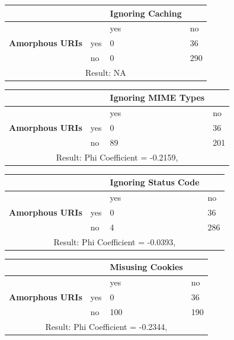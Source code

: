 \documentclass[a4paper,12pt]{article}
\begin{document}
\begin{center}
  \begin{tabular}{| p{60mm} | p{10mm} | p{35mm} | p{35mm} |}
  \hline
   & & \textbf{Ignoring Caching} &
  \\
  \hline
  & & yes & no
  \\
  \hline
  \textbf{Amorphous URIs} & yes & 0 & 36
  \\
  \hline
   & no & 0 & 290
  \\
  \hline
  \multicolumn{4}{|c|}{Result: NA}
  \\ \hline
  \end{tabular}
  \end{center}

\begin{center}
  \begin{tabular}{| p{60mm} | p{10mm} | p{35mm} | p{35mm} |}
  \hline
   & & \textbf{Ignoring MIME Types} &
  \\
  \hline
  & & yes & no
  \\
  \hline
  \textbf{Amorphous URIs} & yes & 0 & 36
  \\
  \hline
   & no & 89 & 201
  \\
  \hline
  \multicolumn{4}{|c|}{Result: Phi Coefficient = -0.2159, }
  \\ \hline
  \end{tabular}
  \end{center}

\begin{center}
  \begin{tabular}{| p{60mm} | p{10mm} | p{35mm} | p{35mm} |}
  \hline
   & & \textbf{Ignoring Status Code} &
  \\
  \hline
  & & yes & no
  \\
  \hline
  \textbf{Amorphous URIs} & yes & 0 & 36
  \\
  \hline
   & no & 4 & 286
  \\
  \hline
  \multicolumn{4}{|c|}{Result: Phi Coefficient = -0.0393, }
  \\ \hline
  \end{tabular}
  \end{center}

\begin{center}
  \begin{tabular}{| p{60mm} | p{10mm} | p{35mm} | p{35mm} |}
  \hline
   & & \textbf{Misusing Cookies} &
  \\
  \hline
  & & yes & no
  \\
  \hline
  \textbf{Amorphous URIs} & yes & 0 & 36
  \\
  \hline
   & no & 100 & 190
  \\
  \hline
  \multicolumn{4}{|c|}{Result: Phi Coefficient = -0.2344, }
  \\ \hline
  \end{tabular}
  \end{center}
\end{document}

